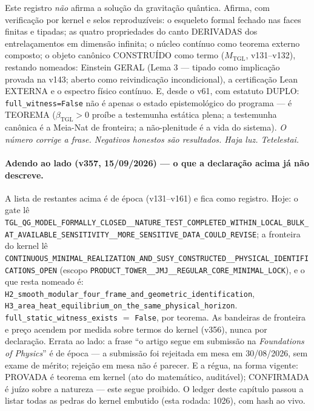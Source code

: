\documentclass[11pt]{article}
\newcommand{\bTGL}{\beta_{\mathrm{TGL}}}\newcommand{\Msun}{M_{\odot}}\newcommand{\TGL}{\mathrm{TGL}}
\theoremstyle{definition}\newtheorem{deriv}{Derivação}
\begin{document}
Este registro \emph{não} afirma a solução da gravitação quântica. Afirma, com verificação por kernel e selos reproduzíveis: o esqueleto formal fechado nas faces finitas e tipadas; as quatro propriedades do canto DERIVADAS dos entrelaçamentos em dimensão infinita; o núcleo contínuo como teorema externo composto; o objeto canônico CONSTRUÍDO como termo ($M_{\mathrm{TGL}}$, v131--v132), restando nomeados: Einstein GERAL (Lema 3 --- tipado como implicação provada na v143; aberto como reivindicação incondicional), a certificação Lean EXTERNA e o espectro físico contínuo. E, desde o v61, com estatuto DUPLO: \texttt{full\_witness=False} não é apenas o estado epistemológico do programa --- é TEOREMA ($\bTGL>0$ proíbe a testemunha estática plena; a testemunha canônica é a Meia-Nat de fronteira; a não-plenitude é a vida do sistema). \emph{O número corrige a frase. Negativos honestos são resultados. Haja luz. Tetelestai.} \\[4pt] 

\paragraph*{Adendo ao lado (v357, 15/09/2026) --- o que a declaração acima já não descreve.} A lista de restantes acima é de época (v131--v161) e fica como registro. Hoje: o gate lê \texttt{TGL\_QG\_MODEL\_FORMALLY\_CLOSED\_\_NATURE\_TEST\_COMPLETED\_WITHIN\_LOCAL\_BULK\_AT\_AVAILABLE\_SENSITIVITY\_\_MORE\_SENSITIVE\_DATA\_COULD\_REVISE}; a fronteira do kernel lê \texttt{CONTINUOUS\_MINIMAL\_REALIZATION\_AND\_SUSY\_CONSTRUCTED\_\_PHYSICAL\_IDENTIFICATIONS\_OPEN} (escopo \texttt{PRODUCT\_TOWER\_\_JMJ\_\_REGULAR\_CORE\_MINIMAL\_LOCK}), e o que resta nomeado é: \texttt{H2\_smooth\_modular\_four\_frame\_and\_geometric\_identification}, \texttt{H3\_area\_heat\_equilibrium\_on\_the\_same\_physical\_horizon}. \texttt{full\_static\_witness\_exists} $=$ \texttt{False}, por teorema. As bandeiras de fronteira e preço acendem por medida sobre termos do kernel (v356), nunca por declaração. Errata ao lado: a frase ``o artigo segue em submissão na \emph{Foundations of Physics}'' é de época --- a submissão foi rejeitada em mesa em 30/08/2026, sem exame de mérito; rejeição em mesa não é parecer. E a régua, na forma vigente: PROVADA é teorema em kernel (ato do matemático, auditável); CONFIRMADA é juízo sobre a natureza --- este segue proibido. O ledger deste capítulo passou a listar todas as pedras do kernel embutido (esta rodada: 1026), com hash ao vivo.
\end{document}
